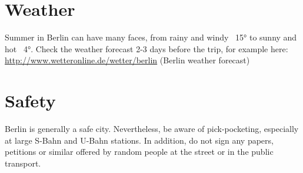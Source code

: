 \section{Weather}

Summer in Berlin can have many faces, from rainy and windy ~15° to sunny and hot ~4°. Check the weather forecast 2-3 days before the trip, for example here: \url{http://www.wetteronline.de/wetter/berlin} (Berlin weather forecast)

\section{Safety}

Berlin is generally a safe city. Nevertheless, be aware of pick-pocketing, especially at large S-Bahn and U-Bahn stations. In addition, do not sign any papers, petitions or similar offered by random people at the street or in the public transport.
